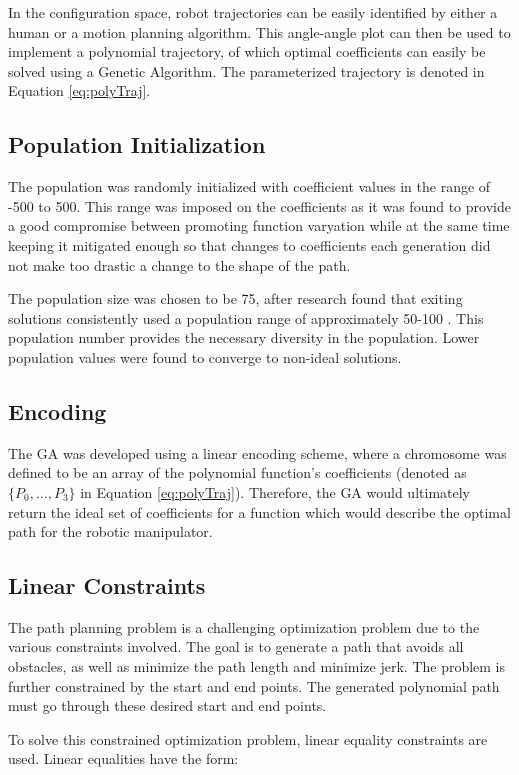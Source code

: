 In the configuration space, robot trajectories can be easily identified by either a human or a motion planning algorithm. This angle-angle plot can then be used to implement a polynomial trajectory, of which optimal coefficients can easily be solved using a Genetic Algorithm. The parameterized trajectory is denoted in Equation \ref{eq:polyTraj}.

\subsection{Population Initialization}

The population was randomly initialized with coefficient values in the range of -500 to 500. This range was imposed on the coefficients as it was found to provide a good compromise between promoting function varyation while at the same time keeping it mitigated enough so that changes to coefficients each generation did not make too drastic a change to the shape of the path.

The population size was chosen to be 75, after research found that exiting solutions consistently used a population range of approximately 50-100 \cite{gulsen95}. This population number provides the necessary diversity in the population. Lower population values were found to converge to non-ideal solutions. 

\subsection{Encoding}
The GA was developed using a linear encoding scheme, where a chromosome was defined to be an array of the polynomial function's coefficients (denoted as $\{P_0, \ldots, P_3\}$ in Equation \ref{eq:polyTraj}). Therefore, the GA would ultimately return the ideal set of coefficients for a function which would describe the optimal path for the robotic manipulator.

\subsection{Linear Constraints}
The path planning problem is a challenging optimization problem due to the various constraints involved. The goal is to generate a path that avoids all obstacles, as well as minimize the path length and minimize jerk. The problem is further constrained by the start and end points. The generated polynomial path must go through these desired start and end points.

To solve this constrained optimization problem, linear equality constraints are used. Linear equalities have the form:

